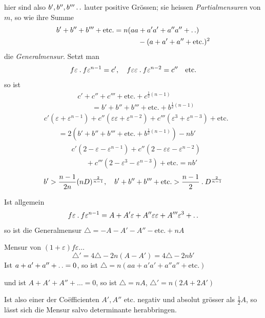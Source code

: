 hier sind also $b',b'',b'''\mathinner{.\,.}$ lauter positive Grössen; sie heissen \emph{Partialmensuren} von $m$, so wie ihre Summe
\[
\begin{aligned}
b'+b''+b'''+\text{etc.}={}&n(aa+a'a'+a''a''+\mathinner{.\,.})\\
&\qquad-(a+a'+a''+\text{etc.})^2
\end{aligned}
\]
die \emph{Generalmensur}. Setzt man
\[
f\varepsilon\mathbin{.} f\varepsilon^{n-1}=c',\quad f\varepsilon\varepsilon\mathbin{.} f\varepsilon^{n-2}=c''\quad\text{etc.}
\]
so ist
\[
\begin{aligned}
&c'+c''+c'''+\text{etc.}+c^{\frac12(n-1)}\\
&\qquad=b'+b''+b'''+\text{etc.}+b^{\frac12(n-1)}
\end{aligned}
\]
\[
\begin{aligned}
&c'(\varepsilon+\varepsilon^{n-1})+c''(\varepsilon\varepsilon+\varepsilon^{n-2})+c'''(\varepsilon^3+\varepsilon^{n-3})+\text{etc.}\\
&\qquad=2(b'+b''+b'''+\text{etc.}+b^{\frac12(n-1)})-nb'
\end{aligned}
\]
\[
\begin{aligned}
&c'(2-\varepsilon-\varepsilon^{n-1})+c''(2-\varepsilon\varepsilon-\varepsilon^{n-2})\\
&\qquad+c'''(2-\varepsilon^3-\varepsilon^{n-3})+\text{etc.}=nb'
\end{aligned}
\]
\[
b'>\frac{n-1}{2n}(nD)^{\frac2{n-1}},\quad b'+b''+b'''+\text{etc.}>\frac{n-1}{2}\mathbin{.} D^{\frac2{n-1}}
\]

Ist allgemein
\[
f\varepsilon\mathbin{.} f\varepsilon^{n-1}=A+A'\varepsilon+A''\varepsilon\varepsilon+A'''\varepsilon^3+\mathinner{.\,.}
\]
so ist die Generalmensur $\triangle=-A-A'-A''-\text{etc.}+nA$

Mensur von $(1+\varepsilon)f\varepsilon\ldots$
\[
\triangle'=4\triangle-2n(A-A')=4\triangle-2nb'
\]
Ist $a+a'+a''+\mathinner{.\,.}=0$, so ist $\triangle=n(aa+a'a'+a''a''+\text{etc.})$

und ist $A+A'+A''+\ldots=0$, so ist $\triangle=nA$, $\triangle'=n(2A+2A')$

Ist also einer der Coëfficienten $A',A''$ etc. negativ und absolut grösser als $\frac12A$, so lässt sich die Mensur salvo determinante herabbringen.

